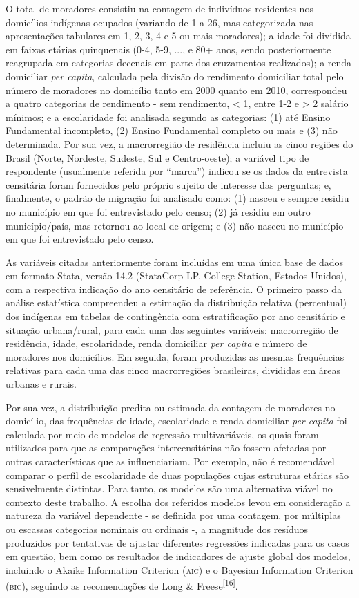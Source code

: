 \documentclass{article}
\begin{document}
O total de moradores consistiu na contagem de indivíduos residentes nos
domicílios indígenas ocupados (variando de 1 a 26, mas categorizada nas
apresentações tabulares em 1, 2, 3, 4 e 5 ou mais moradores); a idade foi
dividida em faixas etárias quinquenais (0-4, 5-9, ..., e 80+ anos, sendo
posteriormente reagrupada em categorias decenais em parte dos cruzamentos
realizados); a renda domiciliar \textit{per capita}, calculada pela divisão do rendimento domiciliar total pelo número de moradores
no domicílio tanto em 2000 quanto em 2010, correspondeu a quatro categorias de
rendimento - sem rendimento, < 1, entre 1-2 e > 2 salário mínimos; e a
escolaridade foi analisada segundo as categorias: (1) até Ensino Fundamental
incompleto, (2) Ensino Fundamental completo ou mais e (3) não determinada. Por
sua vez, a macrorregião de residência incluiu as cinco regiões do Brasil (Norte,
Nordeste, Sudeste, Sul e Centro-oeste); a variável tipo de respondente
(usualmente referida por “marca”) indicou se os dados da entrevista censitária
foram fornecidos pelo próprio sujeito de interesse das perguntas; e, finalmente,
o padrão de migração foi analisado como: (1) nasceu e sempre residiu no
município em que foi entrevistado pelo censo; (2) já residiu em outro
município/país, mas retornou ao local de origem; e (3) não nasceu no município
em que foi entrevistado pelo censo.

As variáveis citadas anteriormente foram incluídas em uma única base de dados em
formato Stata, versão 14.2 (StataCorp LP, College Station, Estados Unidos), com
a respectiva indicação do ano censitário de referência. O primeiro passo da
análise estatística compreendeu a estimação da distribuição relativa
(percentual) dos indígenas em tabelas de contingência com estratificação por ano
censitário e situação urbana/rural, para cada uma das seguintes variáveis:
macrorregião de residência, idade, escolaridade, renda domiciliar \textit{per
capita}
e número de moradores nos domicílios. Em seguida, foram produzidas as mesmas
frequências relativas para cada uma das cinco macrorregiões brasileiras,
divididas em áreas urbanas e rurais.

Por sua vez, a distribuição predita ou estimada da contagem de moradores no
domicílio, das frequências de idade, escolaridade e renda domiciliar \textit{per
capita}
foi calculada por meio de modelos de regressão multivariáveis, os quais foram
utilizados para que as comparações intercensitárias não fossem afetadas por
outras características que as influenciariam. Por exemplo, não é recomendável
comparar o perfil de escolaridade de duas populações cujas estruturas etárias
são sensivelmente distintas. Para tanto, os modelos são uma alternativa viável
no contexto deste trabalho. A escolha dos referidos modelos levou em
consideração a natureza da variável dependente - se definida por uma contagem,
por múltiplas ou escassas categorias nominais ou ordinais -, a magnitude dos
resíduos produzidos por tentativas de ajustar diferentes regressões indicadas
para os casos em questão, bem como os resultados de indicadores de ajuste global
dos modelos, incluindo o Akaike Information Criterion (\textsc{aic}) e o Bayesian
Information Criterion (\textsc{bic}), seguindo as recomendações de Long \& Freese\textsuperscript{[}\textsuperscript{16}\textsuperscript{]}.
\end{document}
